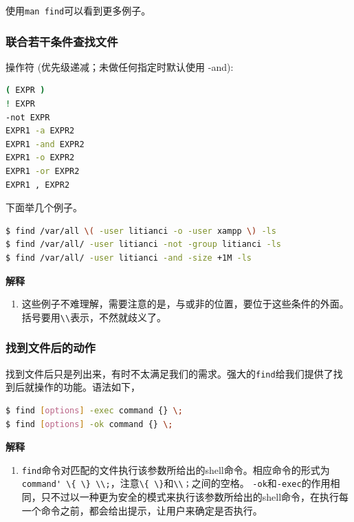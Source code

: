 \documentclass[doctor,openright,twoside]{sjtuthesis}
\providecommand{\tightlist}{%
    \setlength{\itemsep}{0pt}\setlength{\parskip}{0pt}}
\newcommand{\passthrough}[1]{#1}
\theoremstyle{plain}
\theoremstyle{definition}
\theoremstyle{remark}
\theoremstyle{ocrenumbox}
\theoremstyle{plain}
\begin{document}
使用\passthrough{\lstinline!man find!}可以看到更多例子。

\hypertarget{section-81}{%
\subsubsection{联合若干条件查找文件}\label{section-81}}

操作符 (优先级递减；未做任何指定时默认使用 -and):

\begin{lstlisting}[language=bash]
( EXPR )
! EXPR
-not EXPR
EXPR1 -a EXPR2
EXPR1 -and EXPR2
EXPR1 -o EXPR2
EXPR1 -or EXPR2
EXPR1 , EXPR2
\end{lstlisting}

下面举几个例子。

\begin{lstlisting}[language=bash]
$ find /var/all \( -user litianci -o -user xampp \) -ls
$ find /var/all/ -user litianci -not -group litianci -ls
$ find /var/all/ -user litianci -and -size +1M -ls
\end{lstlisting}

\textbf{解释}

\begin{enumerate}
\def\labelenumi{\arabic{enumi}.}
\tightlist
\item
  这些例子不难理解，需要注意的是，与或非的位置，要位于这些条件的外面。括号要用\passthrough{\lstinline!\\!}表示，不然就歧义了。
\end{enumerate}

\hypertarget{section-82}{%
\subsubsection{找到文件后的动作}\label{section-82}}

找到文件后只是列出来，有时不太满足我们的需求。强大的\passthrough{\lstinline!find!}给我们提供了找到后就操作的功能。语法如下，

\begin{lstlisting}[language=bash]
$ find [options] -exec command {} \;
$ find [options] -ok command {} \;
\end{lstlisting}

\textbf{解释}

\begin{enumerate}
\def\labelenumi{\arabic{enumi}.}
\tightlist
\item
  \passthrough{\lstinline!find!}命令对匹配的文件执行该参数所给出的shell命令。相应命令的形式为\passthrough{\lstinline!command' \{ \} \\;!}，注意\passthrough{\lstinline!\{ \}!}和\passthrough{\lstinline!\\；!}之间的空格。
  \passthrough{\lstinline!-ok!}和\passthrough{\lstinline!-exec!}的作用相同，只不过以一种更为安全的模式来执行该参数所给出的shell命令，在执行每一个命令之前，都会给出提示，让用户来确定是否执行。
\end{enumerate}
\end{document}
